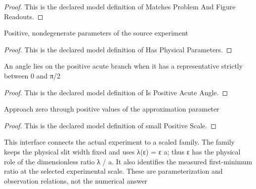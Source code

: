 \begin{proof}
  This is the declared model definition of Matches Problem And Figure Readouts.
\end{proof}
\begin{definition}
  \label{def:physics:phyx-mini-0249:phyxminiproblems-problemphyxmini0249-hasphysicalparameters}
  Positive, nondegenerate parameters of the source experiment
\end{definition}
\begin{proof}
  This is the declared model definition of Has Physical Parameters.
\end{proof}
\begin{definition}
  \label{def:physics:phyx-mini-0249:phyxminiproblems-problemphyxmini0249-ispositiveacuteangle}
  An angle lies on the positive acute branch when it has a representative strictly between 0 and π/2
\end{definition}
\begin{proof}
  This is the declared model definition of Is Positive Acute Angle.
\end{proof}
\begin{definition}
  \label{def:physics:phyx-mini-0249:phyxminiproblems-problemphyxmini0249-smallpositivescale}
  Approach zero through positive values of the approximation parameter
\end{definition}
\begin{proof}
  This is the declared model definition of small Positive Scale.
\end{proof}
\begin{definition}
  \label{def:physics:phyx-mini-0249:phyxminiproblems-problemphyxmini0249-connectsexperimenttoscaledfamily}
  This interface connects the actual experiment to a scaled family. The family keeps the physical slit width fixed and uses λ(ε) = ε a; thus ε has the physical role of the dimensionless ratio λ / a. It also identifies the measured first-minimum ratio at the selected experimental scale. These are parameterization and observation relations, not the numerical answer
\end{definition}
